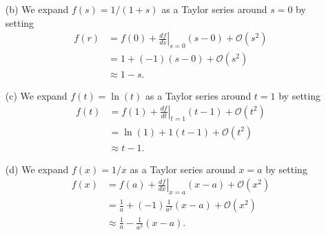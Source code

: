 \begin{enumerate}
\begin{itemize}
			\item[(b)] We expand $f(s) = 1/(1+s)$ as a Taylor series around $s = 0$ by setting
				\begin{equation}
				\begin{split}
					f(r) &= f(0) + \left . \frac{df}{ds}\right |_{s=0} (s- 0) + \mathcal{O}(s^2) \\
					&= 1 + (-1)(s-0) + \mathcal{O}(s^2)\\
					& \approx 1 - s.
				\end{split}
				\end{equation}
				
			\item[(c)] We expand $f(t) = \ln(t)$ as a Taylor series around $t = 1$ by setting
				\begin{equation}
				\begin{split}
					f(t) &= f(1) + \left . \frac{df}{dt}\right |_{t=1} (t - 1) + \mathcal{O}(t^2) \\
					&= \ln(1) + 1(t-1) + \mathcal{O}(t^2)\\
					& \approx t - 1.
				\end{split}
				\end{equation}
				
			\item[(d)] We expand $f(x) = 1/x$ as a Taylor series around $x = a$ by setting
				\begin{equation}
				\begin{split}
					f(x) &= f(a) + \left . \frac{df}{dx}\right |_{x=a} (x - a) + \mathcal{O}(x^2) \\
					&= \frac{1}{a} + (-1) \frac{1}{a^2} (x-a) + \mathcal{O}(x^2)\\
					& \approx \frac{1}{a} - \frac{1}{a^2} (x-a).
				\end{split}
				\end{equation}
			
			
		\end{itemize}
	
\end{enumerate}